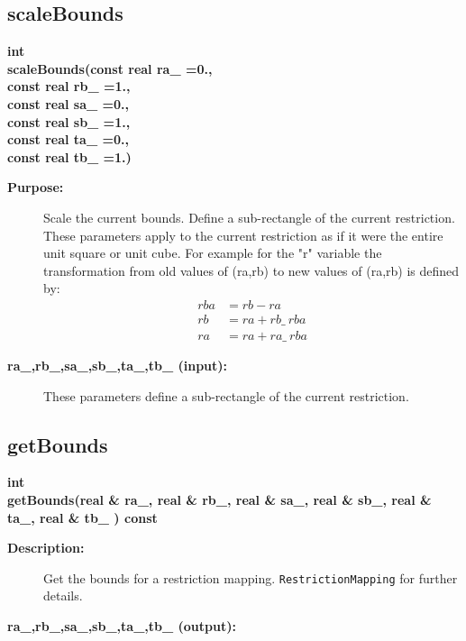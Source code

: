 \subsection{scaleBounds}
 
\begin{flushleft} \textbf{%
int  \\ 
\settowidth{\RestrictionMappingIncludeArgIndent}{scaleBounds(}%
scaleBounds(const real ra\_ =0.,\\ 
\hspace{\RestrictionMappingIncludeArgIndent}const real rb\_ =1., \\ 
\hspace{\RestrictionMappingIncludeArgIndent}const real sa\_ =0.,\\ 
\hspace{\RestrictionMappingIncludeArgIndent}const real sb\_ =1.,\\ 
\hspace{\RestrictionMappingIncludeArgIndent}const real ta\_ =0.,\\ 
\hspace{\RestrictionMappingIncludeArgIndent}const real tb\_   =1.)
}\end{flushleft}
\begin{description}
\item[{\bf Purpose:}]  
    Scale the current bounds. Define a sub-rectangle of the current restriction.
  These parameters apply to the current restriction as if it were the entire unit square
  or unit cube. For example for the "r" variable the transformation from old values of
   (ra,rb) to new values of (ra,rb) is defined by:
  \begin{align*}
     rba &= rb-ra \\
     rb &= ra+rb\_ ~rba \\
     ra &= ra+ra\_ ~rba
  \end{align*}
   
\item[{\bf ra\_,rb\_,sa\_,sb\_,ta\_,tb\_ (input):}]  These parameters define a 
 sub-rectangle of the current restriction.
\end{description}
\subsection{getBounds}
 
\begin{flushleft} \textbf{%
int  \\ 
\settowidth{\RestrictionMappingIncludeArgIndent}{getBounds(}%
getBounds(real \& ra\_, real \& rb\_, real \& sa\_, real \& sb\_, real \& ta\_, real \& tb\_ ) const
}\end{flushleft}
\begin{description}
\item[{\bf Description:}] 
  Get the bounds for a restriction mapping.
   {\tt RestrictionMapping} for further details.
\item[{\bf ra\_,rb\_,sa\_,sb\_,ta\_,tb\_ (output):}]  
\end{description}
